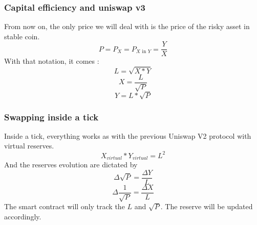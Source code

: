 \documentclass[conference]{IEEEtran}
\begin{document}
\subsubsection{Capital efficiency and uniswap v3}
From now on, the only price we will deal with is the price of the risky asset in stable coin.
\begin{equation}
    P = P_X = P_{X \text{ in }Y}  = \frac{Y}{X}
\end{equation}
With that notation, it comes :
\begin{equation}
    L=\sqrt{X*Y}
\end{equation}
\begin{equation}
    X = \frac{L}{\sqrt{P}}  
\end{equation}
\begin{equation}
    Y = L*\sqrt{P}
\end{equation}
\subsubsection{ Swapping inside a tick}
Inside a tick, everything works as with the previous Uniswap V2 protocol with virtual reserves.
\begin{equation}
    X_{virtual} * Y_{virtual} = L^2
\end{equation}
And the reserves evolution are dictated by
\begin{equation}
   \Delta \sqrt{P} = \frac{\Delta Y}{L}
\end{equation}
\begin{equation}
   \Delta \frac{1}{\sqrt{P}} = \frac{\Delta X}{L}
\end{equation}
The smart contract will only track the $L$ and $\sqrt{P}$. The reserve will be updated
accordingly.
\end{document}
